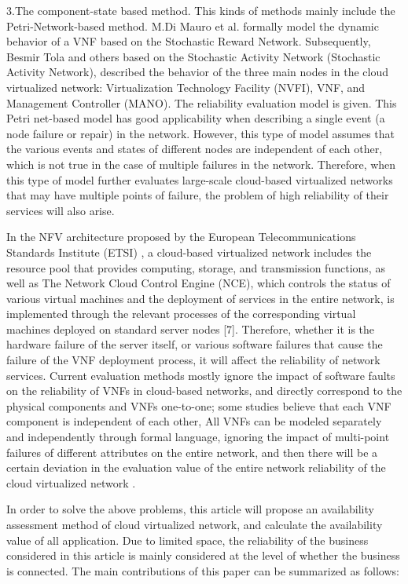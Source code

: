 \documentclass[journal]{IEEEtran}
\begin{document}
 	3.The component-state based method. This kinds of methods mainly include the Petri-Network-based method.
    M.Di Mauro et al. formally model the dynamic behavior of a VNF based on the Stochastic Reward
    Network\cite{MauroGalatro-760,MauroLongo-765}. Subsequently, Besmir Tola and others based on the Stochastic Activity
    Network (Stochastic Activity Network), described the behavior of the three main nodes in the cloud virtualized
    network: Virtualization Technology Facility (NVFI), VNF, and Management Controller (MANO). The reliability evaluation
    model \cite{TolaJiang-743,TolaJiang-759} is given. This Petri net-based model has good applicability when describing
    a single event (a node failure or repair) in the network. However, this type of model assumes that the various events
    and states of different nodes are independent of each other, which is not true in the case of multiple failures in
    the network. Therefore, when this type of model further evaluates large-scale cloud-based virtualized networks that
    may have multiple points of failure, the problem of high reliability of their services will also arise.

    In the NFV architecture proposed by the European Telecommunications Standards Institute (ETSI) \cite{NakamuraAdams-750, SchollerKhan-751}, a cloud-based virtualized network includes the resource pool that provides computing, storage, and transmission functions, as well as The Network Cloud Control Engine (NCE), which controls the status of various virtual machines and the deployment of services in the entire network, is implemented through the relevant processes of the corresponding virtual machines deployed on standard server nodes [7]. Therefore, whether it is the hardware failure of the server itself, or various software failures that cause the failure of the VNF deployment process, it will affect the reliability of network services. Current evaluation methods mostly ignore the impact of software faults on the reliability of VNFs in cloud-based networks, and directly correspond to the physical components and VNFs one-to-one; some studies believe that each VNF component is independent of each other, All VNFs can be modeled separately and independently through formal language, ignoring the impact of multi-point failures of different attributes on the entire network, and then there will be a certain deviation in the evaluation value of the entire network reliability of the cloud virtualized network .

    In order to solve the above problems, this article will propose an availability assessment method of cloud virtualized network, and calculate the availability value of all application. Due to limited space, the reliability of the business considered in this article is mainly considered at the level of whether the business is connected. The main contributions of this paper can be summarized as follows:
    
\end{document}
